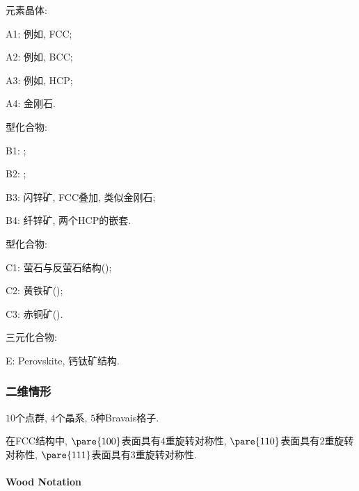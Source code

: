 \documentclass[hidelinks]{ctexart}
\begin{document}
\begin{cenum}
    \item 元素晶体:
    \begin{cenum}
        \item A1: 例如, FCC;
        \item A2: 例如, BCC;
        \item A3: 例如, HCP;
        \item A4: 金刚石.
    \end{cenum}
    \item {}型化合物:
    \begin{cenum}
        \item B1: ;
        \item B2: ;
        \item B3: 闪锌矿, FCC叠加, 类似金刚石;
        \item B4: 纤锌矿, 两个HCP的嵌套.
    \end{cenum}
    \item {}型化合物:
    \begin{cenum}
        \item C1: 萤石与反萤石结构();
        \item C2: 黄铁矿();
        \item C3: 赤铜矿().
    \end{cenum}
    \item 三元化合物:
    \begin{cenum}
        \item E: Perovskite, 钙钛矿结构.
    \end{cenum}
\end{cenum}


\subsubsection{二维情形} %
\label{ssub:二维情形}

$10$个点群, $4$个晶系, $5$种Bravais格子.
\begin{sample}
    \begin{ex}
        在FCC结构中, $\pare{100}$表面具有$4$重旋转对称性, $\pare{110}$表面具有$2$重旋转对称性, $\pare{111}$表面具有$3$重旋转对称性.
    \end{ex}
\end{sample}

\paragraph{Wood Notation} %
\label{par:wood_notation}
\end{document}
